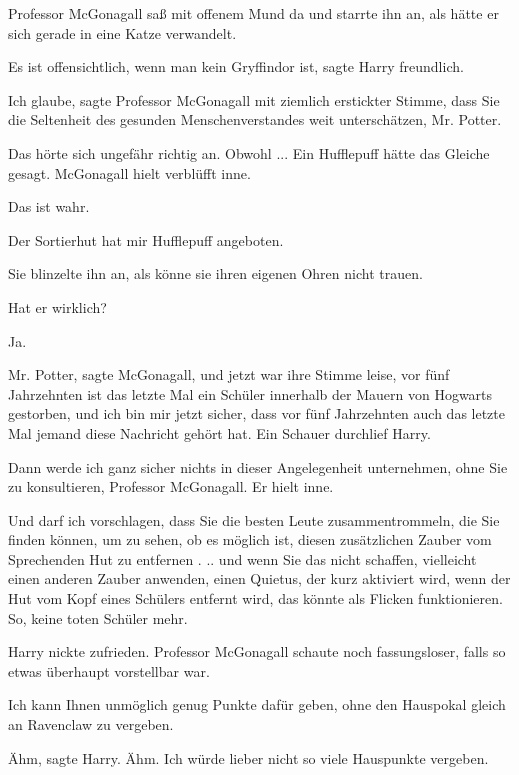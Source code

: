 Professor McGonagall saß mit offenem Mund da und starrte ihn an, als hätte er
sich gerade in eine Katze verwandelt.

\glqq{}Es ist offensichtlich, wenn man kein Gryffindor ist\grqq{}, sagte Harry
freundlich.

\glqq{}Ich glaube\grqq{}, sagte Professor McGonagall mit ziemlich erstickter
Stimme, \glqq{}dass Sie die Seltenheit des gesunden Menschenverstandes weit
unterschätzen, Mr. Potter.\grqq{}

Das hörte sich ungefähr richtig an. Obwohl ... \glqq{}Ein Hufflepuff hätte das
Gleiche gesagt.\grqq{} McGonagall hielt verblüfft inne.

\glqq{}Das ist wahr.\grqq{}

\glqq{}Der Sortierhut hat mir Hufflepuff angeboten.\grqq{}

Sie blinzelte ihn an, als könne sie ihren eigenen Ohren nicht trauen.

\glqq{}Hat er wirklich?\grqq{}

\glqq{}Ja.\grqq{}

\glqq{}Mr. Potter\grqq{}, sagte McGonagall, und jetzt war ihre Stimme leise,
\glqq{}vor fünf Jahrzehnten ist das letzte Mal ein Schüler innerhalb der Mauern
von Hogwarts gestorben, und ich bin mir jetzt sicher, dass vor fünf Jahrzehnten
auch das letzte Mal jemand diese Nachricht gehört hat.\grqq{} Ein Schauer
durchlief Harry.

\glqq{}Dann werde ich ganz sicher nichts in dieser Angelegenheit unternehmen,
ohne Sie zu konsultieren, Professor McGonagall.\grqq{} Er hielt inne.

\glqq{}Und darf ich vorschlagen, dass Sie die besten Leute zusammentrommeln, die
Sie finden können, um zu sehen, ob es möglich ist, diesen zusätzlichen Zauber
vom Sprechenden Hut zu entfernen . .. und wenn Sie das nicht schaffen,
vielleicht einen anderen Zauber anwenden, einen Quietus, der kurz aktiviert
wird, wenn der Hut vom Kopf eines Schülers entfernt wird, das könnte als Flicken
funktionieren. So, keine toten Schüler mehr.\grqq{}

Harry nickte zufrieden. Professor McGonagall schaute noch fassungsloser, falls
so etwas überhaupt vorstellbar war.

\glqq{}Ich kann Ihnen unmöglich genug Punkte dafür geben, ohne den Hauspokal
gleich an Ravenclaw zu vergeben.\grqq{}

\glqq{}Ähm\grqq{}, sagte Harry. \glqq{}Ähm. Ich würde lieber nicht so viele
Hauspunkte vergeben.\grqq{}

